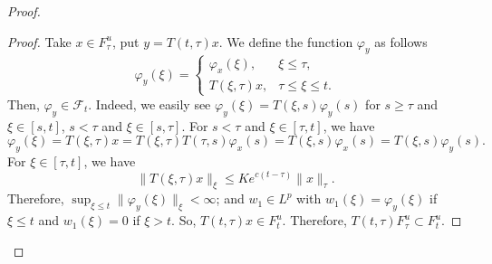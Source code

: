\documentclass[reqno]{amsart}
\begin{document}
\begin{proof}
\begin{proof}
Take $x\in F^{u}_{\tau}$, put $y=T(t,\tau)x$. We define the function $\varphi_y$ as follows
$$ 
\varphi_y(\xi)=
\begin{cases}
\varphi_x(\xi),& \xi \le \tau,\\
T(\xi,\tau)x,& \tau \le \xi \le t.
\end{cases}
 $$
Then, $\varphi_{y}\in \mathcal{F}_{t}$. Indeed, we easily see  $\varphi_y(\xi)=T(\xi, s)\varphi_{y}(s)$ for $s\ge \tau$ and $\xi \in [s,t]$, $s<\tau$ and $\xi \in[s,\tau]$.
For  $s<\tau$ and $\xi \in [\tau, t]$, we have
$$\varphi_y(\xi)=T(\xi, \tau)x = T(\xi, \tau)T(\tau, s)\varphi_{x}(s)=T(\xi,s)\varphi_x(s)=T(\xi, s)\varphi_{y}(s).$$
For $\xi \in [\tau, t]$, we have 
$$ \|T(\xi,\tau)x\|_{\xi} \le K e^{c(t-\tau)}\|x\|_{\tau}. $$
Therefore, $\sup_{\xi \le t}\|\varphi_y(\xi)\|_{\xi} <\infty$; and
$w_1 \in L^p$ with $w_1(\xi)=\varphi_y(\xi)$ if $\xi \le t$ and $w_1(\xi)=0$ if $\xi >t$. So, $T(t,\tau)x \in F^{u}_t$.
Therefore, $T(t,\tau) F^{u}_{\tau} \subset F^{u}_t$.


\end{proof}
\end{proof}
\end{document}
